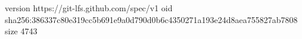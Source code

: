version https://git-lfs.github.com/spec/v1
oid sha256:386337c80e319cc5b691e9a0d790d0b6c4350271a193e24d8aea755827ab7808
size 4743
